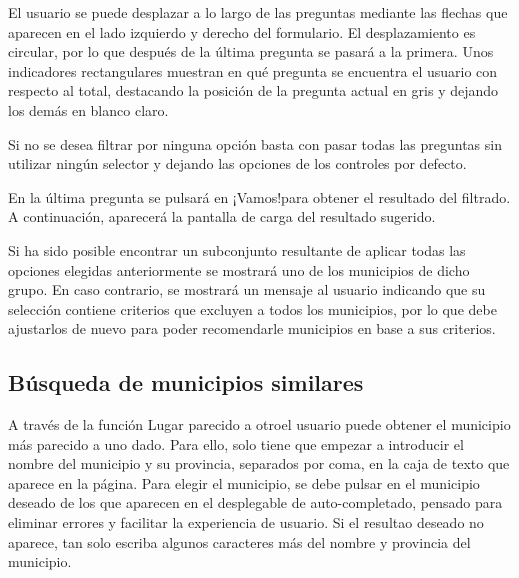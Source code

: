 
El usuario se puede desplazar a lo largo de las preguntas mediante las flechas que aparecen en el lado izquierdo y derecho del formulario. El desplazamiento es circular, por lo que después de la última pregunta se pasará a la primera. Unos indicadores rectangulares muestran en qué pregunta se encuentra el usuario con respecto al total, destacando la posición de la pregunta actual en gris y dejando los demás en blanco claro.


Si no se desea filtrar por ninguna opción basta con pasar todas las preguntas sin utilizar ningún selector y dejando las opciones de los controles por defecto.


En la última pregunta se pulsará en \guillemotleft ¡Vamos!\guillemotright\space para obtener el resultado del filtrado. A continuación, aparecerá la pantalla de carga del resultado sugerido.


Si ha sido posible encontrar un subconjunto resultante de aplicar todas las opciones elegidas anteriormente se mostrará uno de los municipios de dicho grupo. En caso contrario, se mostrará un mensaje al usuario indicando que su selección contiene criterios que excluyen a todos los municipios, por lo que debe ajustarlos de nuevo para poder recomendarle municipios en base a sus criterios.


\subsection{Búsqueda de municipios similares}

A través de la función \guillemotleft Lugar parecido a otro\guillemotright\space el usuario puede obtener el municipio más parecido a uno dado. Para ello, solo tiene que empezar a introducir el nombre del municipio y su provincia, separados por coma, en la caja de texto que aparece en la página. Para elegir el municipio, se debe pulsar en el municipio deseado de los que aparecen en el desplegable de auto-completado, pensado para eliminar errores y facilitar la experiencia de usuario. Si el resultao deseado no aparece, tan solo escriba algunos caracteres más del nombre y provincia del municipio.

